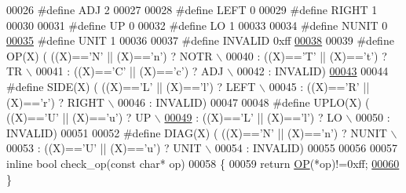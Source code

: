 \begin{DoxyCode}
00026 \textcolor{preprocessor}{#define ADJ     2}
00027 
00028 \textcolor{preprocessor}{#define LEFT    0}
00029 \textcolor{preprocessor}{#define RIGHT   1}
00030 
00031 \textcolor{preprocessor}{#define UP      0}
00032 \textcolor{preprocessor}{#define LO      1}
00033 
00034 \textcolor{preprocessor}{#define NUNIT   0}
\hyperlink{struct_eigen_1_1internal_1_1general__rank1__update_3_01_scalar_00_01_index_00_01_row_major_00_01_conj_lhs_00_01_conj_rhs_01_4}{00035} \textcolor{preprocessor}{#define UNIT    1}
00036 
00037 \textcolor{preprocessor}{#define INVALID 0xff}
\hyperlink{struct_eigen_1_1internal_1_1packed__rank2__update__selector}{00038} 
00039 \textcolor{preprocessor}{#define OP(X)   (   ((X)=='N' || (X)=='n') ? NOTR   \(\backslash\)}
00040 \textcolor{preprocessor}{                  : ((X)=='T' || (X)=='t') ? TR     \(\backslash\)}
00041 \textcolor{preprocessor}{                  : ((X)=='C' || (X)=='c') ? ADJ    \(\backslash\)}
00042 \textcolor{preprocessor}{                  : INVALID)}
\hyperlink{struct_eigen_1_1internal_1_1selfadjoint__packed__rank1__update_3_01_scalar_00_01_index_00_01_row44ee905dfbb7f4c0a9e13e624ea4a89c}{00043} 
00044 \textcolor{preprocessor}{#define SIDE(X) (   ((X)=='L' || (X)=='l') ? LEFT   \(\backslash\)}
00045 \textcolor{preprocessor}{                  : ((X)=='R' || (X)=='r') ? RIGHT  \(\backslash\)}
00046 \textcolor{preprocessor}{                  : INVALID)}
00047 
00048 \textcolor{preprocessor}{#define UPLO(X) (   ((X)=='U' || (X)=='u') ? UP     \(\backslash\)}
\hyperlink{struct_eigen_1_1internal_1_1packed__triangular__solve__vector_3_01_lhs_scalar_00_01_rhs_scalar_04173d9937406f96b80cda304747c263c}{00049} \textcolor{preprocessor}{                  : ((X)=='L' || (X)=='l') ? LO     \(\backslash\)}
00050 \textcolor{preprocessor}{                  : INVALID)}
00051 
00052 \textcolor{preprocessor}{#define DIAG(X) (   ((X)=='N' || (X)=='n') ? NUNIT  \(\backslash\)}
00053 \textcolor{preprocessor}{                  : ((X)=='U' || (X)=='u') ? UNIT   \(\backslash\)}
00054 \textcolor{preprocessor}{                  : INVALID)}
00055 
00056 
00057 \textcolor{keyword}{inline} \textcolor{keywordtype}{bool} check\_op(\textcolor{keyword}{const} \textcolor{keywordtype}{char}* op)
00058 \{
00059   \textcolor{keywordflow}{return} \hyperlink{struct_eigen_1_1internal_1_1_o_p}{OP}(*op)!=0xff;
\hyperlink{struct_eigen_1_1internal_1_1band__solve__triangular__selector_3_01_index_00_01_mode_00_01_lhs_sc55928e6c4094ec753b4bf039aa77c921}{00060} \}

\end{DoxyCode}
